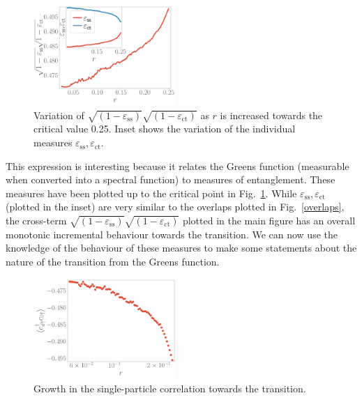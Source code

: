 \documentclass[reprint,superscriptaddress,floatfix]{revtex4-2}
\begin{document}
\begin{figure}[!htb]
	\centering
	\includegraphics[width=0.48\textwidth]{entanglement.pdf}
	\caption{Variation of \(\sqrt{\left(1 - \varepsilon_\text{ss} \right)}\sqrt{\left(1 - \varepsilon_\text{ct} \right)}\) as \(r\) is increased towards the critical value 0.25. Inset shows the variation of the individual measures \(\varepsilon_\text{ss},\varepsilon_\text{ct}\).}
	\label{entng}
\end{figure}

This expression is interesting because it relates the Greens function (measurable when converted into a spectral function) to measures of entanglement.
These measures have been plotted up to the critical point in Fig.~\ref{entng}.
While \(\varepsilon_\text{ss},\varepsilon_\text{ct}\) (plotted in the inset) are very similar to the overlaps plotted in Fig.~\ref{overlaps}, the cross-term \(\sqrt{\left(1 - \varepsilon_\text{ss} \right)}\sqrt{\left(1 - \varepsilon_\text{ct} \right)}\) plotted in the main figure has an overall monotonic incremental behaviour towards the transition.
We can now use the knowledge of the behaviour of these measures to make some statements about the nature of the transition from the Greens function.

\begin{figure}[!htb]
	\centering
	\includegraphics[width=0.48\textwidth]{corr_1p.pdf}
	\caption{Growth in the single-particle correlation towards the transition.}
	\label{one-particle}
\end{figure}
\end{document}
